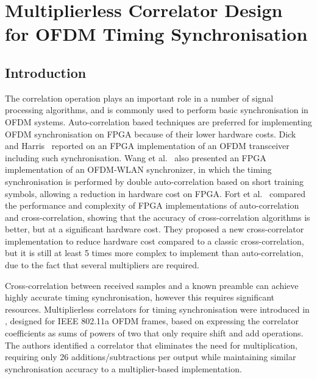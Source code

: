 \chapter{Multiplierless Correlator Design for OFDM Timing Synchronisation}
\label{chap:multiplierlesscorrelator}

\section{Introduction}
The correlation operation plays an important role in a number of signal processing algorithms, and is commonly used to perform basic synchronisation in OFDM systems.
Auto-correlation based techniques are preferred for implementing OFDM synchronisation on FPGA because of their lower hardware costs.
Dick and Harris~\cite{Dick2003} reported on an FPGA implementation of an OFDM transceiver including such synchronisation.
Wang et al.~\cite{Wang2004} also presented an FPGA implementation of an OFDM-WLAN synchronizer, in which the timing synchronisation is performed by double auto-correlation based on short training symbols, allowing a reduction in hardware cost on FPGA.
Fort et al.~\cite{Fort2003} compared the performance and complexity of FPGA implementations of auto-correlation and cross-correlation, showing that the accuracy of cross-correlation algorithms is better, but at a significant hardware cost.
They proposed a new cross-correlator implementation to reduce hardware cost compared to a classic cross-correlation, but it is still at least 5 times more complex to implement than auto-correlation, due to the fact that several multipliers are required.

Cross-correlation between received samples and a known preamble can achieve highly accurate timing synchronisation, however this requires significant resources.
Multiplierless correlators for timing synchronisation were introduced in \cite{Yip2003}, designed for IEEE 802.11a OFDM frames, based on expressing the correlator coefficients as sums of powers of two that only require shift and add operations.
The authors identified a correlator that eliminates the need for multiplication, requiring only 26 additions/subtractions per output while maintaining similar synchronisation accuracy to a multiplier-based implementation.

